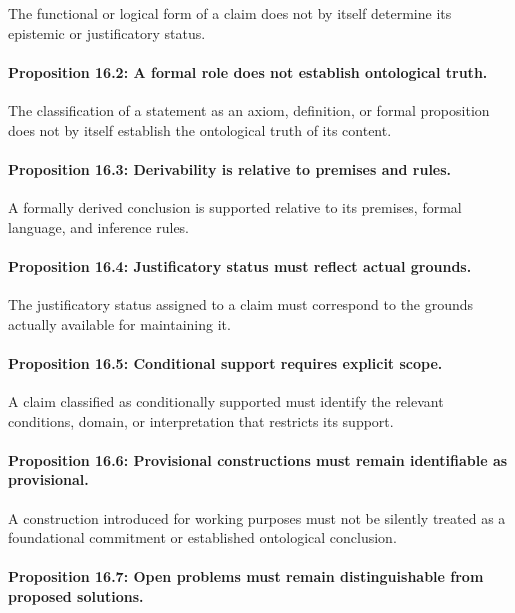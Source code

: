 The functional
or logical
form of
a claim
does not
by itself
determine its
epistemic or
justificatory
status.

\paragraph{Proposition 16.2: A formal role does not establish ontological truth.}

The classification
of a statement
as an axiom,
definition, or
formal proposition
does not
by itself
establish the
ontological truth
of its content.

\paragraph{Proposition 16.3: Derivability is relative to premises and rules.}

A formally
derived conclusion
is supported
relative to
its premises,
formal language,
and inference
rules.

\paragraph{Proposition 16.4: Justificatory status must reflect actual grounds.}

The justificatory
status assigned
to a claim
must correspond
to the
grounds actually
available for
maintaining it.

\paragraph{Proposition 16.5: Conditional support requires explicit scope.}

A claim
classified as
conditionally supported
must identify
the relevant
conditions, domain,
or interpretation
that restricts
its support.

\paragraph{Proposition 16.6: Provisional constructions must remain identifiable as provisional.}

A construction
introduced for
working purposes
must not
be silently
treated as
a foundational
commitment or
established ontological
conclusion.

\paragraph{Proposition 16.7: Open problems must remain distinguishable from proposed solutions.}

